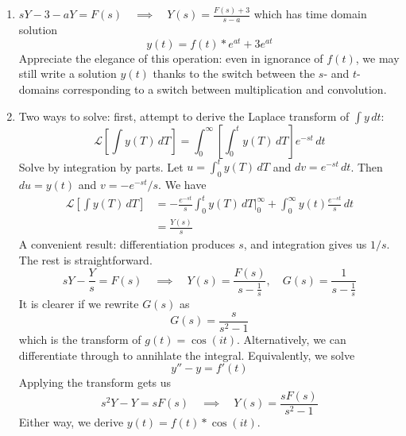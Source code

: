 \documentclass[a4paper]{article}
\begin{document}
\begin{enumerate}[label=(\alph*)]
	\item \( sY - 3 - aY = F \!\left( s \right) \quad \implies \quad Y \!\left( s \right) = \displaystyle{\frac{F \!\left( s \right) + 3}{s - a}} \) which has time domain solution
	\[
		y \!\left( t \right) = f \!\left( t \right) * e^{at} + 3e^{at} 
	\]
	Appreciate the elegance of this operation: even in ignorance of \( f \!\left( t \right) \), we may still write a solution \( y \!\left( t \right) \) thanks to the switch between the \( s \)- and \( t \)-domains corresponding to a switch between multiplication and convolution.
	\item Two ways to solve: first, attempt to derive the Laplace transform of \( \int y \, dt \):
	\[
		\mathcal{L}\!\left[ \int y \!\left( T \right) \, dT \right] = \int^{\infty}_{0} \!\left[ \int^{t}_{0} y \!\left( T \right) \, dT \right]e^{-st} \, dt 
	\]
	Solve by integration by parts. Let \( u = \displaystyle{\int^{t}_{0} y \!\left( T \right) \, dT } \) and \( dv = e^{-st} \, dt \). Then \( du = y \!\left( t \right) \) and \( v = -e^{-st} / s \). We have
	\begin{align*}
		\mathcal{L}\!\left[ \int y \!\left( T \right) \, dT \right] & = -\frac{e^{-st}}{s} \int^{t}_{0} y \!\left( T \right) \, dT \Big|^{\infty}_{0} + \int^{\infty}_{0} y \!\left( t \right) \frac{e^{-st}}{s} \, dt \\
		 & = \frac{Y \!\left( s \right)}{s}
	\end{align*}
	A convenient result: differentiation produces \( s \), and integration gives us \( 1 / s \). The rest is straightforward.
	\[
		sY - \frac{Y}{s} = F \!\left( s \right) \quad \implies \quad Y \!\left( s \right) = \frac{F \!\left( s \right)}{s - \frac{1}{s}}, \quad G \!\left( s \right) = \frac{1}{s - \frac{1}{s}}
	\]
	It is clearer if we rewrite \( G \!\left( s \right) \) as 
	\[
		G \!\left( s \right) = \frac{s}{s^{2} - 1} 
	\]
	which is the transform of \( g \!\left( t \right) = \cos\!\left(it\right) \).
	Alternatively, we can differentiate through to annihlate the integral. Equivalently, we solve
	\[
		y'' - y = f'\!\left( t \right) 
	\]
	Applying the transform gets us
	\[
		s^{2}Y - Y = s F \!\left( s \right) \quad \implies \quad Y \!\left( s \right) = \frac{s F \!\left( s \right)}{s^{2} - 1}
	\]
	Either way, we derive \( y \!\left( t \right) = f \!\left( t \right) * \cos\!\left(it\right) \).
\end{enumerate}

\end{document}
